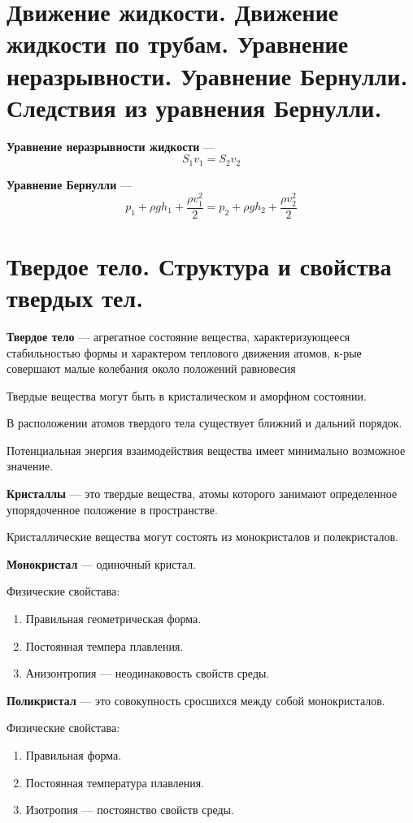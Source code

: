 \documentclass{report}
\begin{document}
\part{Движение жидкости. 
Движение жидкости по трубам. 
Уравнение неразрывности. 
Уравнение Бернулли. 
Следствия из уравнения Бернулли.}

{\bf Уравнение неразрывности жидкости} ---
$$
S_1v_1=S_2v_2
$$

{\bf Уравнение Бернулли} ---
$$
p_1+\rho gh_1+\frac{\rho v_1^2}{2}=p_2+\rho gh_2+\frac{\rho v_2^2}{2}
$$



\part{Твердое тело. 
Структура и свойства твердых тел.}

{\bf Твердое тело} ---
агрегатное состояние вещества, характеризующееся стабильностью формы и характером 
теплового движения атомов, к-рые совершают малые колебания около положений равновесия

Твердые вещества могут быть в кристалическом и аморфном состоянии.

В расположении атомов твердого тела существует ближний и дальний порядок.

Потенциальная энергия взаимодействия вещества имеет минимально возможное значение.

{\bf Кристаллы} ---
это твердые вещества, атомы которого занимают определенное упорядоченное положение в пространстве.

Кристаллические вещества могут состоять из монокристалов и полекристалов.

{\bf Монокристал} ---
одиночный кристал.

Физические свойстава:
\begin{enumerate}
  \item Правильная геометрическая форма.
  \item Постоянная темпера плавления.
  \item Анизонтропия --- неодинаковость свойств среды. 
\end{enumerate}

{\bf Поликристал} ---
это совокупность сросшихся между собой монокристалов.

Физические свойстава:
\begin{enumerate}
  \item Правильная форма.
  \item Постоянная температура плавления.
  \item Изотропия --- постоянство свойств среды.
\end{enumerate}
\end{document}
